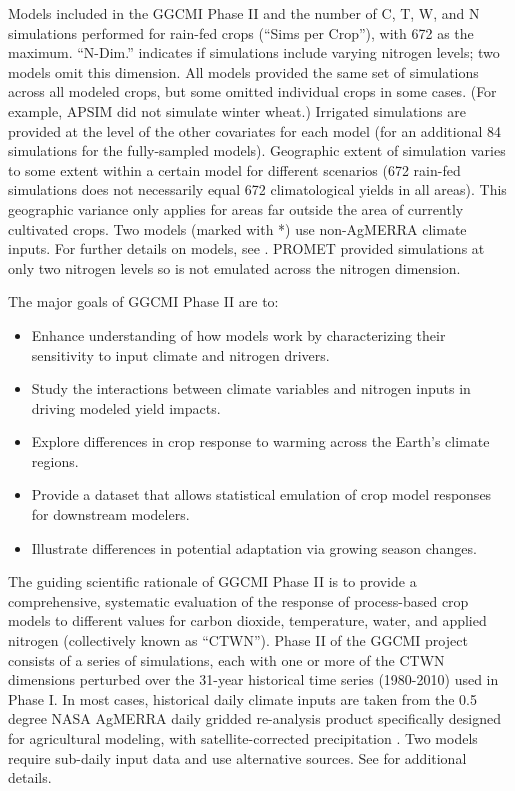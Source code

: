 \documentclass[preprint, 5p, times, twocolumn]{elsarticle}
\begin{document}
{\begin{table}[!t]
 \caption{Models included in the GGCMI Phase II and the number of C, T, W, and N simulations performed for rain-fed crops (``Sims per Crop''), with 672 as the maximum. ``N-Dim.'' indicates if simulations include varying nitrogen levels; two models omit this dimension. All models provided the same set of simulations across all modeled crops, but some omitted individual crops in some cases. (For example, APSIM did not simulate winter wheat.) Irrigated simulations are provided at the level of the other covariates for each model (for an additional 84 simulations for the fully-sampled models). Geographic extent of simulation varies to some extent within a certain model for different scenarios (672 rain-fed simulations does not necessarily equal 672 climatological yields in all areas). This geographic variance only applies for areas far outside the area of currently cultivated crops. Two models (marked with *) use non-AgMERRA climate inputs. For further details on models, see \citet{Elliott2015}. \dag PROMET provided simulations at only two nitrogen levels so is not emulated across the nitrogen dimension.} 
\label{table:models}
\end{table}

The major goals of GGCMI Phase II are to:
\begin{itemize}
  \setlength\itemsep{0.3mm}
    \item Enhance understanding of how models work by characterizing their sensitivity to input climate and nitrogen drivers.
    \item Study the interactions between climate variables and nitrogen inputs in driving modeled yield impacts. 
    \item Explore differences in crop response to warming across the Earth's climate regions.
    \item Provide a dataset that allows statistical emulation of crop model responses for downstream modelers.
    \item Illustrate differences in potential adaptation via growing season changes. 
\end{itemize}

The guiding scientific rationale of GGCMI Phase II is to provide a comprehensive, systematic evaluation of the response of process-based crop models to different values for carbon dioxide, temperature, water, and applied nitrogen (collectively known as ``CTWN''). Phase II of the GGCMI project consists of a series of simulations, each with one or more of the CTWN dimensions perturbed over the 31-year historical time series (1980-2010) used in Phase I. In most cases, historical daily climate inputs are taken from the 0.5 degree NASA AgMERRA daily gridded re-analysis product specifically designed for agricultural modeling, with satellite-corrected precipitation \citep{Ruane2015}. Two models require sub-daily input data and use alternative sources. See \citet{Elliott2015} for additional details. 

}
\end{document}

